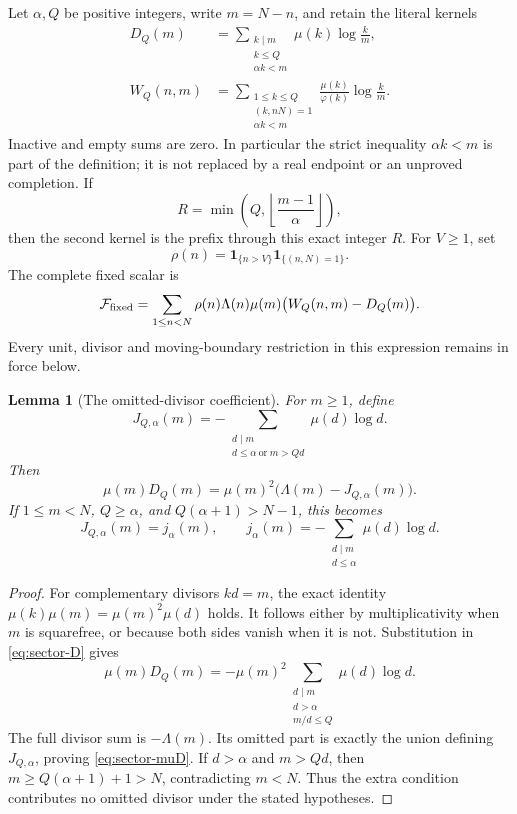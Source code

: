 \documentclass[11pt,a4paper]{article}
\newtheorem{lemma}[theorem]{Lemma}
\theoremstyle{definition}
\theoremstyle{remark}
\begin{document}
Let $\alpha,Q$ be positive integers, write $m=N-n$, and retain the
literal kernels
\begin{align}
 D_Q(m)&=\sum_{\substack{k\mid m\\ k\leq Q\\\alpha k<m}}
                         \mu(k)\log\frac{k}{m},\label{eq:sector-D}\\
 W_Q(n,m)&=\sum_{\substack{1\leq k\leq Q\\(k,nN)=1\\\alpha k<m}}
                         \frac{\mu(k)}{\varphi(k)}\log\frac{k}{m}.
 \label{eq:sector-W}
\end{align}
Inactive and empty sums are zero.  In particular the strict inequality
$\alpha k<m$ is part of the definition; it is not replaced by a real
endpoint or an unproved completion.  If
\[
 R=\min\left(Q,\left\lfloor\frac{m-1}{\alpha}\right\rfloor\right),
\]
then the second kernel is the prefix through this exact integer $R$.
For $V\geq1$, set
\[
 \rho(n)=\mathbf1_{\{n>V\}}\mathbf1_{\{(n,N)=1\}}.
\]
The complete fixed scalar is
\begin{equation}
 \mathcal F_{\rm fixed}
 =\sum_{1\leq n<N}\rho(n)\Lambda(n)\mu(m)
                            \bigl(W_Q(n,m)-D_Q(m)\bigr).
 \label{eq:sector-fixed-scalar}
\end{equation}
Every unit, divisor and moving-boundary restriction in this expression
remains in force below.

\begin{lemma}[The omitted-divisor coefficient]
\label{lem:sector-omitted-divisors}
For $m\geq1$, define
\[
 J_{Q,\alpha}(m)
 =-\sum_{\substack{d\mid m\\ d\leq\alpha\ \text{or}\ m>Qd}}
                                      \mu(d)\log d.
\]
Then
\begin{equation}
 \mu(m)D_Q(m)=\mu(m)^2
                 \bigl(\Lambda(m)-J_{Q,\alpha}(m)\bigr).
 \label{eq:sector-muD}
\end{equation}
If $1\leq m<N$, $Q\geq\alpha$, and $Q(\alpha+1)>N-1$, this becomes
\[
 J_{Q,\alpha}(m)=j_\alpha(m),\qquad
 j_\alpha(m)=-\sum_{\substack{d\mid m\\d\leq\alpha}}\mu(d)\log d.
\]
\end{lemma}
\begin{proof}
For complementary divisors $kd=m$, the exact identity
$\mu(k)\mu(m)=\mu(m)^2\mu(d)$ holds.  It follows either by
multiplicativity when $m$ is squarefree, or because both sides vanish
when it is not.  Substitution in \eqref{eq:sector-D} gives
\[
 \mu(m)D_Q(m)
 =-\mu(m)^2\sum_{\substack{d\mid m\\ d>\alpha\\m/d\leq Q}}
                                  \mu(d)\log d.
\]
The full divisor sum is $-\Lambda(m)$.  Its omitted part is exactly
the union defining $J_{Q,\alpha}$, proving \eqref{eq:sector-muD}.
If $d>\alpha$ and $m>Qd$, then
$m\geq Q(\alpha+1)+1>N$, contradicting $m<N$.  Thus the extra
condition contributes no omitted divisor under the stated hypotheses.
\end{proof}
\end{document}
